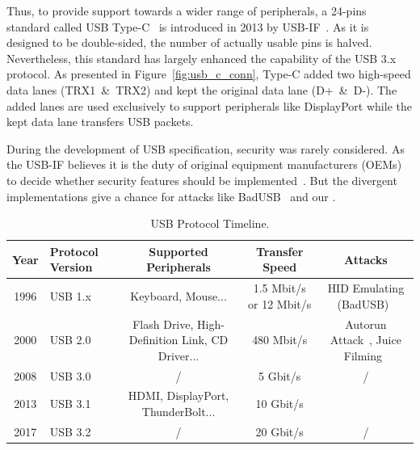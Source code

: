 Thus, to provide support towards a wider range of peripherals, a 24-pins
standard called USB Type-C~\cite{typec} is introduced in 2013 by USB-IF~\cite{usbif}. As it is designed to be double-sided, the number of actually usable
pins is halved. Nevertheless, this standard has largely enhanced the capability
of the USB 3.x protocol. As presented in Figure~\ref{fig:usb_c_conn}, Type-C added
two high-speed data lanes \mbox{(TRX1 \& TRX2)} and kept the original data lane \mbox{(D+ \&
D-)}. The added lanes are used exclusively to support peripherals like
DisplayPort while the kept data lane transfers USB packets.

During the development of USB specification, security was rarely considered. As
the USB-IF believes it is the duty of original equipment manufacturers \mbox{(OEMs)}
to decide whether security features should be implemented~\cite{usbsec}. But the divergent implementations give a chance for attacks like
BadUSB~\cite{rubber} and our \tool.

\begin{table}
\begin{tabular}{|c|l|c|c|c|}
	\hline
	\textbf{Year} & \textbf{Protocol Version} & \textbf{Supported Peripherals} & \textbf{Transfer Speed} & \textbf{Attacks} \\
	\hline
	1996 & USB 1.x~\cite{usb10,usb11} & Keyboard, Mouse... & 1.5 Mbit/s or 12 Mbit/s & HID Emulating (BadUSB)~\cite{badusb} \\
	\hline
	2000 & USB 2.0~\cite{usb20} & Flash Drive, High-Definition Link, CD Driver... & 480 Mbit/s & Autorun Attack~\cite{duqu}, Juice Filming~\cite{JFC,JFCImpact} \\
	\hline
	2008 & USB 3.0~\cite{usb30} & / & 5 Gbit/s & / \\
	\hline
	2013 & USB 3.1~\cite{usb31} & HDMI, DisplayPort, ThunderBolt... & 10 Gbit/s & \tool \\
	\hline
	2017 & USB 3.2~\cite{usb32} & / & 20 Gbit/s & / \\
	\hline
\end{tabular}
	\linebreak
\caption{USB Protocol Timeline.}
\label{table:usb_timeline}
\end{table}
